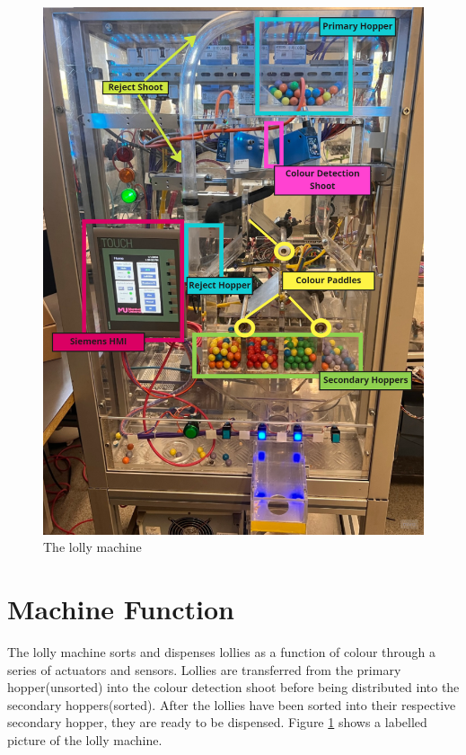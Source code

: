     \begin{figure}[H]
        \centering
        \includegraphics[scale = 0.5]{2_images/lollyMachine}
        \caption{The lolly machine}
        \label{fig:lollyMachine}
    \end{figure}

\section{Machine Function}
    The lolly machine sorts and dispenses lollies as a function of colour through a series of actuators and sensors. Lollies are transferred from the primary hopper(unsorted) into the colour detection shoot before being distributed into the secondary hoppers(sorted). After the lollies have been sorted into their respective secondary hopper, they are ready to be dispensed. Figure \ref{fig:lollyMachine} shows a labelled picture of the lolly machine. 

